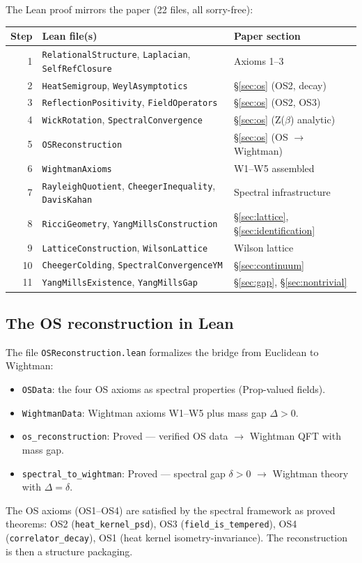 \documentclass[11pt]{article}
\theoremstyle{definition}
\begin{document}
The Lean proof mirrors the paper (22 files, all sorry-free):
\begin{center}
\renewcommand{\arraystretch}{1.2}
\begin{tabular}{@{} r l l @{}}
\hline
\textbf{Step} & \textbf{Lean file(s)} & \textbf{Paper section} \\
\hline
1 & \texttt{RelationalStructure}, \texttt{Laplacian}, \texttt{SelfRefClosure} & Axioms 1--3 \\
2 & \texttt{HeatSemigroup}, \texttt{WeylAsymptotics} & \S\ref{sec:os} (OS2, decay) \\
3 & \texttt{ReflectionPositivity}, \texttt{FieldOperators} & \S\ref{sec:os} (OS2, OS3) \\
4 & \texttt{WickRotation}, \texttt{SpectralConvergence} & \S\ref{sec:os} (Z($\beta$) analytic) \\
5 & \texttt{OSReconstruction} & \S\ref{sec:os} (OS $\to$ Wightman) \\
6 & \texttt{WightmanAxioms} & W1--W5 assembled \\
7 & \texttt{RayleighQuotient}, \texttt{CheegerInequality}, \texttt{DavisKahan} & Spectral infrastructure \\
8 & \texttt{RicciGeometry}, \texttt{YangMillsConstruction} & \S\ref{sec:lattice}, \S\ref{sec:identification} \\
9 & \texttt{LatticeConstruction}, \texttt{WilsonLattice} & Wilson lattice \\
10 & \texttt{CheegerColding}, \texttt{SpectralConvergenceYM} & \S\ref{sec:continuum} \\
11 & \texttt{YangMillsExistence}, \texttt{YangMillsGap} & \S\ref{sec:gap}, \S\ref{sec:nontrivial} \\
\hline
\end{tabular}
\end{center}

\subsection{The OS reconstruction in Lean}

The file \texttt{OSReconstruction.lean} formalizes the bridge from Euclidean to Wightman:
\begin{itemize}
    \item \texttt{OSData}: the four OS axioms as spectral properties (Prop-valued fields).
    \item \texttt{WightmanData}: Wightman axioms W1--W5 plus mass gap $\Delta > 0$.
    \item \texttt{os\_reconstruction}: Proved --- verified OS data $\to$ Wightman QFT with mass gap.
    \item \texttt{spectral\_to\_wightman}: Proved --- spectral gap $\delta > 0$ $\to$ Wightman theory with $\Delta = \delta$.
\end{itemize}
The OS axioms (OS1--OS4) are satisfied by the spectral framework as proved theorems:
OS2 (\texttt{heat\_kernel\_psd}), OS3 (\texttt{field\_is\_tempered}), OS4 (\texttt{correlator\_decay}), OS1 (heat kernel isometry-invariance). The reconstruction is then a structure packaging.
\end{document}
